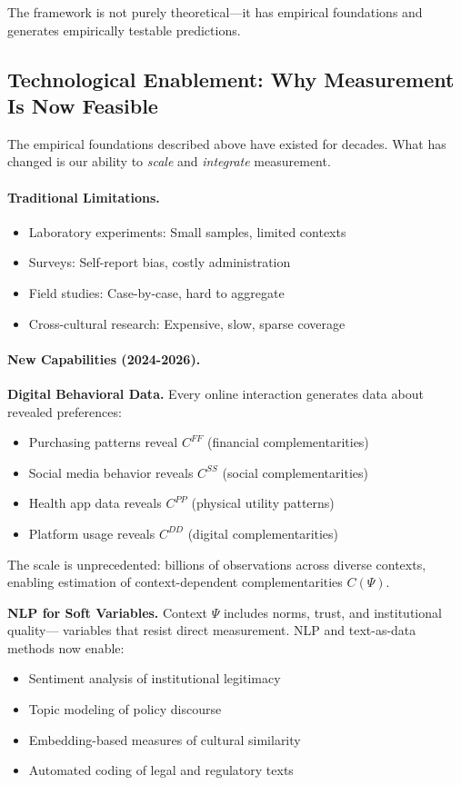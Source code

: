 \documentclass[12pt,a4paper]{article}
\begin{document}
The framework is not purely theoretical---it has empirical foundations
and generates empirically testable predictions.

\subsection{Technological Enablement: Why Measurement Is Now Feasible}

The empirical foundations described above have existed for decades.
What has changed is our ability to \emph{scale} and \emph{integrate} measurement.

\paragraph{Traditional Limitations.}
\begin{itemize}
  \item Laboratory experiments: Small samples, limited contexts
  \item Surveys: Self-report bias, costly administration
  \item Field studies: Case-by-case, hard to aggregate
  \item Cross-cultural research: Expensive, slow, sparse coverage
\end{itemize}

\paragraph{New Capabilities (2024-2026).}

\textbf{Digital Behavioral Data.}
Every online interaction generates data about revealed preferences:
\begin{itemize}
  \item Purchasing patterns reveal $C^{FF}$ (financial complementarities)
  \item Social media behavior reveals $C^{SS}$ (social complementarities)
  \item Health app data reveals $C^{PP}$ (physical utility patterns)
  \item Platform usage reveals $C^{DD}$ (digital complementarities)
\end{itemize}

The scale is unprecedented: billions of observations across diverse contexts,
enabling estimation of context-dependent complementarities $C(\Psi)$.

\textbf{NLP for Soft Variables.}
Context $\Psi$ includes norms, trust, and institutional quality---
variables that resist direct measurement. NLP and text-as-data methods \citep{gentzkow2019} now enable:
\begin{itemize}
  \item Sentiment analysis of institutional legitimacy
  \item Topic modeling of policy discourse
  \item Embedding-based measures of cultural similarity
  \item Automated coding of legal and regulatory texts
\end{itemize}
\end{document}
